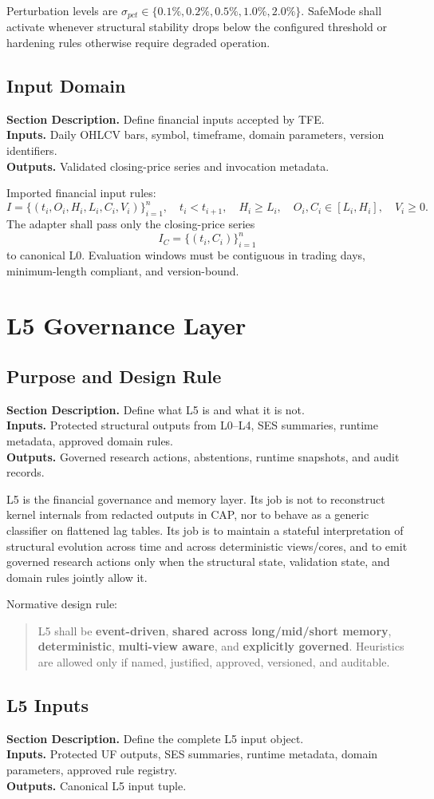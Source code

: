 \documentclass[11pt]{report}
\newcommand{\meta}[3]{\textbf{Section Description.} #1\\
\textbf{Inputs.} #2\\
\textbf{Outputs.} #3\par}
\begin{document}
Perturbation levels are $\sigma_{pct}\in\{0.1\%,0.2\%,0.5\%,1.0\%,2.0\%\}$. SafeMode shall activate whenever structural stability drops below the configured threshold or hardening rules otherwise require degraded operation.

\section{Input Domain}
\meta{Define financial inputs accepted by TFE.}{Daily OHLCV bars, symbol, timeframe, domain parameters, version identifiers.}{Validated closing-price series and invocation metadata.}

Imported financial input rules:
\[
I = \{(t_i,O_i,H_i,L_i,C_i,V_i)\}_{i=1}^{n},\quad t_i<t_{i+1},\quad H_i\ge L_i,\quad O_i,C_i\in[L_i,H_i],\quad V_i\ge 0.
\]
The adapter shall pass only the closing-price series
\[
I_C = \{(t_i,C_i)\}_{i=1}^{n}
\]
to canonical L0. Evaluation windows must be contiguous in trading days, minimum-length compliant, and version-bound.
\chapter{L5 Governance Layer}
\section{Purpose and Design Rule}
\meta{Define what L5 is and what it is not.}{Protected structural outputs from L0--L4, SES summaries, runtime metadata, approved domain rules.}{Governed research actions, abstentions, runtime snapshots, and audit records.}

L5 is the financial governance and memory layer. Its job is not to reconstruct kernel internals from redacted outputs in CAP, nor to behave as a generic classifier on flattened lag tables. Its job is to maintain a stateful interpretation of structural evolution across time and across deterministic views/cores, and to emit governed research actions only when the structural state, validation state, and domain rules jointly allow it.

Normative design rule:
\begin{quote}
L5 shall be \textbf{event-driven}, \textbf{shared across long/mid/short memory}, \textbf{deterministic}, \textbf{multi-view aware}, and \textbf{explicitly governed}. Heuristics are allowed only if named, justified, approved, versioned, and auditable.
\end{quote}

\section{L5 Inputs}
\meta{Define the complete L5 input object.}{Protected UF outputs, SES summaries, runtime metadata, domain parameters, approved rule registry.}{Canonical L5 input tuple.}
\end{document}
